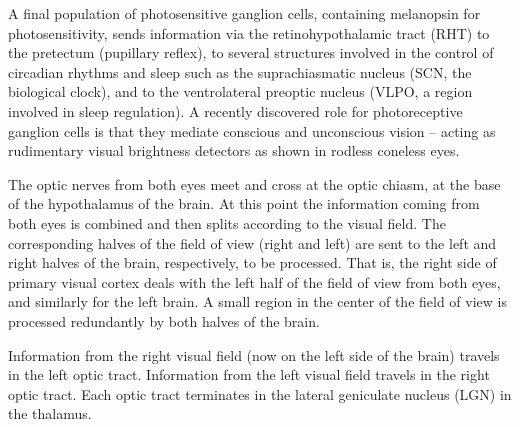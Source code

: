 A final population of photosensitive ganglion cells, containing melanopsin for photosensitivity, sends information via the retinohypothalamic tract (RHT) to the pretectum (pupillary reflex), to several structures involved in the control of circadian rhythms and sleep such as the suprachiasmatic nucleus (SCN, the biological clock), and to the ventrolateral preoptic nucleus (VLPO, a region involved in sleep regulation). A recently discovered role for photoreceptive ganglion cells is that they mediate conscious and unconscious vision -- acting as rudimentary visual brightness detectors as shown in rodless coneless eyes.

The optic nerves from both eyes meet and cross at the optic chiasm, at the base of the hypothalamus of the brain. At this point the information coming from both eyes is combined and then splits according to the visual field. The corresponding halves of the field of view (right and left) are sent to the left and right halves of the brain, respectively, to be processed. That is, the right side of primary visual cortex deals with the left half of the field of view from both eyes, and similarly for the left brain. A small region in the center of the field of view is processed redundantly by both halves of the brain.

Information from the right visual field (now on the left side of the brain) travels in the left optic tract. Information from the left visual field travels in the right optic tract. Each optic tract terminates in the lateral geniculate nucleus (LGN) in the thalamus.

